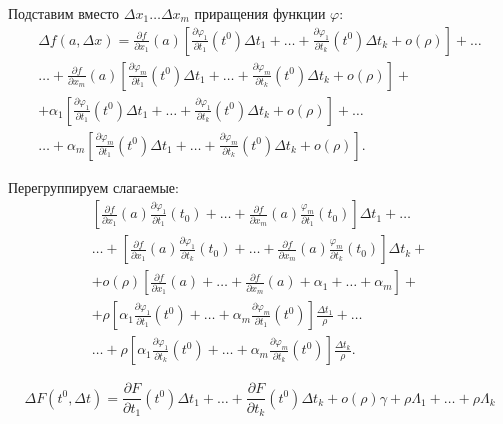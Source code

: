 \documentclass[a4paper,12pt]{article} %
\begin{document}
 Подставим вместо $\Delta x_1 \ldots \Delta x_m$ приращения функции $\varphi$:\\
 \begin{multline*}
 	\Delta f(a, \Delta x) = \frac {\partial f}{\partial x_1}(a)\left[\frac{\partial \varphi_1}{\partial t_1}(t^0)\Delta t_1 + \ldots + \frac{\partial \varphi_1}{\partial t_k}(t^0)\Delta t_k + o(\rho)\right] + \ldots\\
 	\ldots + \frac {\partial f}{\partial x_m}(a) \left[\frac{\partial \varphi_m}{\partial t_1}(t^0)\Delta t_1 + \ldots + \frac{\partial \varphi_m}{\partial t_k}(t^0)\Delta t_k + o(\rho)\right] +\\ +\alpha_1\left[\frac{\partial \varphi_1}{\partial t_1}(t^0)\Delta t_1 + \ldots + \frac{\partial \varphi_1}{\partial t_k}(t^0)\Delta t_k + o(\rho)\right] + \ldots \\
 	\ldots + \alpha_m \left[\frac{\partial \varphi_m}{\partial t_1}(t^0)\Delta t_1 + \ldots + \frac{\partial \varphi_m}{\partial t_k}(t^0)\Delta t_k + o(\rho)\right].
 \end{multline*}
 
 Перегруппируем слагаемые:
 \begin{multline*}
 	 \left[\frac{\partial f}{\partial x_1}(a)\frac{\partial\varphi_1}{\partial t_1}(t_0) + \ldots + \frac{\partial f}{\partial x_m}(a)\frac{\varphi_m}{\partial t_1}(t_0)\right]\Delta t_1 + \ldots\\
 	 \ldots + \left[\frac{\partial f}{\partial x_1}(a)\frac{\partial\varphi_1}{\partial t_k}(t_0) + \ldots + \frac{\partial f}{\partial x_m}(a)\frac{\varphi_m}{\partial t_k}(t_0)\right]\Delta t_k + \\
 	 +o(\rho)\left[\frac{\partial f}{\partial x_1}(a) + \ldots + \frac{\partial f}{\partial x_m}(a) + \alpha_1 + \ldots + \alpha_m\right] + \\
 	 +\rho\left[\alpha_1\frac{\partial \varphi_1}{\partial t_1}(t^0) + \ldots + \alpha_m \frac{\partial \varphi_m}{\partial t_1}(t^0)\right]\frac{\Delta t_1}{\rho} + \ldots \\
 	 \ldots + \rho\left[\alpha_1\frac{\partial \varphi_1}{\partial t_k}(t^0) + \ldots + \alpha_m \frac{\partial \varphi_m}{\partial t_k}(t^0)\right]\frac{\Delta t_k}{\rho}. 
 \end{multline*}
 
 \[ \Delta F(t^0, \Delta t) = \frac{\partial F}{\partial t_1}(t^0)\Delta t_1 + \ldots + \frac{\partial F}{\partial t_k}(t^0)\Delta t_k + o(\rho)\gamma + \rho\Lambda_1 + \ldots + \rho \Lambda_k\]
\end{document}
